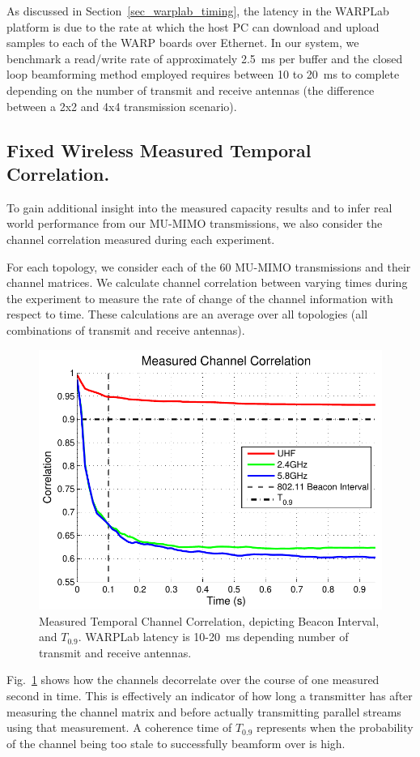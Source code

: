 	As discussed in Section~\ref{sec_warplab_timing}, the latency in the WARPLab platform is due to the rate at which the host PC can download and upload samples to each of the WARP boards over Ethernet. 
	In our system, we benchmark a read/write rate of approximately 2.5~ms per buffer and the closed loop beamforming method employed requires between  10 to 20~ms to complete depending on the number of transmit and receive antennas (the difference between a 2x2 and 4x4 transmission scenario).


\subsection{Fixed Wireless Measured Temporal Correlation.}
\label{sec_fixed_temporal}

To gain additional insight into the measured capacity results and to infer real world performance from 
our MU-MIMO transmissions, we also consider the channel correlation measured during each experiment.

For each topology, we consider each of the 60 MU-MIMO transmissions and their channel matrices.
We calculate channel correlation between varying times during the experiment to measure the rate of change of the channel information with respect to time.  
These calculations are an average over all topologies (all combinations of transmit and receive antennas).


\begin{figure}[th]
	\centering
 	 \includegraphics[width=0.7\linewidth]{figs/measCorrWl}   
   	 \caption{Measured Temporal Channel Correlation, depicting Beacon Interval, and $T_{0.9}$.  WARPLab latency is 10-20~ms depending number of transmit and receive antennas.
	\label{fig:meas_corr}}
\end{figure}


Fig.~\ref{fig:meas_corr} shows how the channels decorrelate over the course of one measured second in time.
This is effectively an indicator of how long a transmitter has after measuring the channel matrix and before actually transmitting parallel streams using that measurement.  
A coherence time of $T_{0.9}$ represents when the probability of the channel being too stale to successfully beamform over is high.

